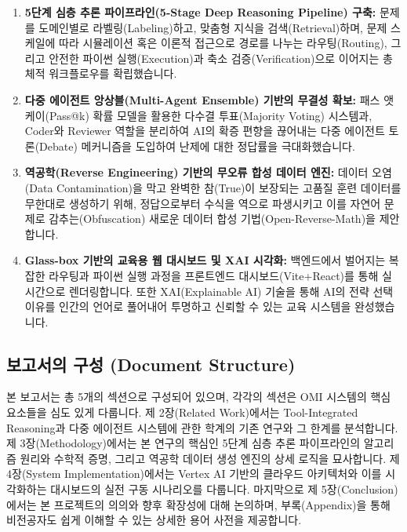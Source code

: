 \begin{enumerate}
    \item \textbf{5단계 심층 추론 파이프라인(5-Stage Deep Reasoning Pipeline) 구축:} 
    문제를 도메인별로 라벨링(Labeling)하고, 맞춤형 지식을 검색(Retrieval)하며, 문제 스케일에 따라 시뮬레이션 혹은 이론적 접근으로 경로를 나누는 라우팅(Routing), 그리고 안전한 파이썬 실행(Execution)과 축소 검증(Verification)으로 이어지는 총체적 워크플로우를 확립했습니다.
    
    \item \textbf{다중 에이전트 앙상블(Multi-Agent Ensemble) 기반의 무결성 확보:} 
    패스 앳 케이(Pass@k) 확률 모델을 활용한 다수결 투표(Majority Voting) 시스템과, Coder와 Reviewer 역할을 분리하여 AI의 확증 편향을 끊어내는 다중 에이전트 토론(Debate) 메커니즘을 도입하여 난제에 대한 정답률을 극대화했습니다.
    
    \item \textbf{역공학(Reverse Engineering) 기반의 무오류 합성 데이터 엔진:} 
    데이터 오염(Data Contamination)을 막고 완벽한 참(True)이 보장되는 고품질 훈련 데이터를 무한대로 생성하기 위해, 정답으로부터 수식을 역으로 파생시키고 이를 자연어 문제로 감추는(Obfuscation) 새로운 데이터 합성 기법(Open-Reverse-Math)을 제안합니다.
    
    \item \textbf{Glass-box 기반의 교육용 웹 대시보드 및 XAI 시각화:} 
    백엔드에서 벌어지는 복잡한 라우팅과 파이썬 실행 과정을 프론트엔드 대시보드(Vite+React)를 통해 실시간으로 렌더링합니다. 또한 XAI(Explainable AI) 기술을 통해 AI의 전략 선택 이유를 인간의 언어로 풀어내어 투명하고 신뢰할 수 있는 교육 시스템을 완성했습니다.
\end{enumerate}

\subsection{보고서의 구성 (Document Structure)}
본 보고서는 총 5개의 섹션으로 구성되어 있으며, 각각의 섹션은 OMI 시스템의 핵심 요소들을 심도 있게 다룹니다.
제 2장(Related Work)에서는 Tool-Integrated Reasoning과 다중 에이전트 시스템에 관한 학계의 기존 연구와 그 한계를 분석합니다.
제 3장(Methodology)에서는 본 연구의 핵심인 5단계 심층 추론 파이프라인의 알고리즘 원리와 수학적 증명, 그리고 역공학 데이터 생성 엔진의 상세 로직을 묘사합니다.
제 4장(System Implementation)에서는 Vertex AI 기반의 클라우드 아키텍처와 이를 시각화하는 대시보드의 실전 구동 시나리오를 다룹니다.
마지막으로 제 5장(Conclusion)에서는 본 프로젝트의 의의와 향후 확장성에 대해 논의하며, 부록(Appendix)을 통해 비전공자도 쉽게 이해할 수 있는 상세한 용어 사전을 제공합니다.
